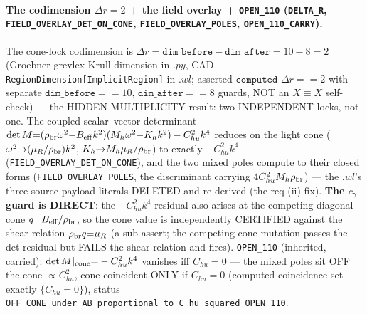 \paragraph{The codimension \(\Delta r{=}2\) + the field overlay + \texttt{OPEN\_110} (\texttt{DELTA\_R}, \texttt{FIELD\_OVERLAY\_DET\_ON\_CONE}, \texttt{FIELD\_OVERLAY\_POLES}, \texttt{OPEN\_110\_CARRY}).}
The cone-lock codimension is \(\Delta r{=}\texttt{dim\_before}-\texttt{dim\_after}{=}10-8{=}2\)
(Groebner grevlex Krull dimension in \(.py\), CAD
\texttt{RegionDimension[ImplicitRegion]} in \(.wl\); asserted
\(\texttt{computed }\Delta r{==}2\) with separate \(\texttt{dim\_before}{==}10\),
\(\texttt{dim\_after}{==}8\) guards, NOT an \(X{\equiv}X\) self-check) --- the
HIDDEN MULTIPLICITY result: two INDEPENDENT locks, not one. The coupled
scalar--vector determinant
\(\det M{=}(\rho_{\rm br}\omega^2{-}B_{\rm eff}k^2)(M_h\omega^2{-}K_h k^2)-C_{hu}^2k^4\)
reduces on the light cone
(\(\omega^2{\to}(\mu_R/\rho_{\rm br})k^2\), \(K_h{\to}M_h\mu_R/\rho_{\rm br}\)) to
exactly \(-C_{hu}^2k^4\) (\texttt{FIELD\_OVERLAY\_DET\_ON\_CONE}), and the two mixed
poles compute to their closed forms (\texttt{FIELD\_OVERLAY\_POLES}, the
discriminant carrying \(4C_{hu}^2M_h\rho_{\rm br}\)) --- the \(.wl\)'s three source
payload literals DELETED and re-derived (the req-(ii) fix). \textbf{The \(c_\gamma\)
guard is DIRECT}: the \(-C_{hu}^2k^4\) residual also arises at the competing
diagonal cone \(q{=}B_{\rm eff}/\rho_{\rm br}\), so the cone value is independently
CERTIFIED against the shear relation \(\rho_{\rm br}q{=}\mu_R\) (a sub-assert; the
competing-cone mutation passes the det-residual but FAILS the shear relation and
fires). \texttt{OPEN\_110} (inherited, carried): \(\det M|_{\rm cone}{=}-C_{hu}^2k^4\)
vanishes iff \(C_{hu}{=}0\) --- the mixed poles sit OFF the cone \(\propto C_{hu}^2\),
cone-coincident ONLY if \(C_{hu}{=}0\) (computed coincidence set exactly
\(\{C_{hu}{=}0\}\)), status
\texttt{OFF\_CONE\_under\_AB\_proportional\_to\_C\_hu\_squared\_OPEN\_110}.

